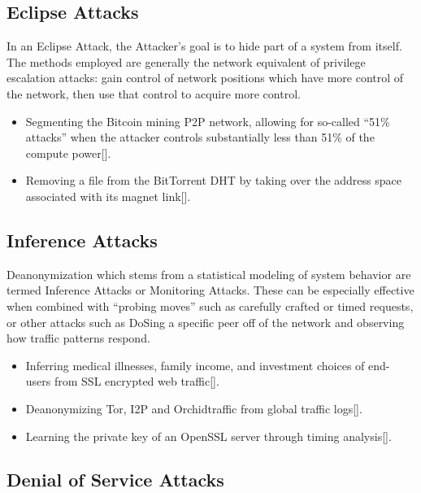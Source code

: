 \documentclass{article}
\newcommand{\orchid}{Orchid}
\newcommand{\Orchid}{\orchid}
\begin{document}
\subsection{Eclipse Attacks}

In an Eclipse Attack, the Attacker's goal is to hide part of a system from itself. The methods employed are generally the network equivalent of privilege escalation attacks: gain control of network positions which have more control of the network, then use that control to acquire more control.

\begin{itemize}
\item Segmenting the Bitcoin mining P2P network, allowing for so-called “51\% attacks” when the attacker controls substantially less than 51\% of the compute power[].
\item Removing a file from the BitTorrent DHT by taking over the address space associated with its magnet link[].
\end{itemize}

\subsection{Inference Attacks}
\label{inference-attacks}

Deanonymization which stems from a statistical modeling of system behavior are termed Inference Attacks or Monitoring Attacks. These can be especially effective when combined with “probing moves” such as carefully crafted or timed requests, or other attacks such as DoSing a specific peer off of the network and observing how traffic patterns respond.

\begin{itemize}
\item Inferring medical illnesses, family income, and investment choices of end- users from SSL encrypted web traffic[].
\item Deanonymizing Tor, I2P and \Orchid traffic from global traffic logs[].
\item Learning the private key of an OpenSSL server through timing analysis[].
\end{itemize}

\subsection{Denial of Service Attacks}
\end{document}
